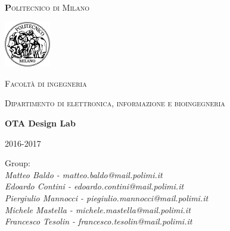 \begin{titlepage}

	\centering
	{\scshape\huge\textbf Politecnico di Milano \par}
	\vspace{0.5cm}

	\includegraphics[width=0.15\textwidth]{Immagini/logo.png}\par\vspace{0.2cm}
	
	{\scshape\small Facoltà di ingegneria\par}
	{\scshape\small Dipartimento di elettronica, informazione e bioingegneria\par}
	\vspace{1.5cm}
	{\huge\bfseries OTA Design Lab\par}
	\vspace{1.5cm}
	{\scshape \par}
	{\scshape\small 2016-2017 \par}
	\vspace{2cm}
	\vfill
	
	\raggedright
    {Group:\\ \textit{Matteo Baldo - matteo.baldo@mail.polimi.it \\ Edoardo Contini - edoardo.contini@mail.polimi.it \\ Piergiulio Mannocci - piegiulio.mannocci@mail.polimi.it \\ Michele Mastella - michele.mastella@mail.polimi.it \\ Francesco Tesolin - francesco.tesolin@mail.polimi.it }
	
	}\vfill
	
	\end{titlepage}
